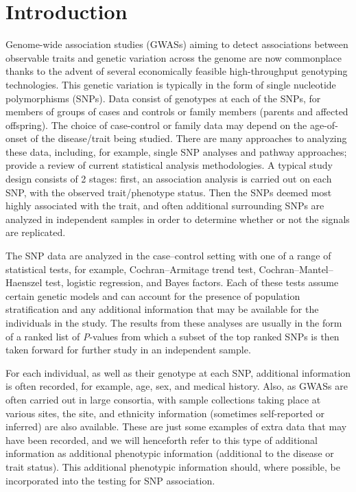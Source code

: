 \documentclass[oupdraft]{bio}
\begin{document}
\section{Introduction}
\label{sec1}

Genome-wide association studies (GWASs) aiming to detect
associations between observable traits and genetic variation
across the genome are now commonplace thanks to the advent of
several economically feasible high-throughput genotyping
technologies. This genetic variation is typically in the form of
single nucleotide polymorphisms (SNPs). Data consist of genotypes
at each of the SNPs, for members of groups of cases and controls
or family members (parents and affected offspring). The choice
of case-control or family data may depend on the age-of-onset
of the disease/trait being studied. There are many approaches to
analyzing these data, including, for example, single SNP
analyses and pathway approaches;
\citet{allison2006}
provide a review of current statistical analysis methodologies.
A typical study design consists of 2 stages: first, an association
analysis is carried out on each SNP, with the observed trait/phenotype
status. Then the SNPs deemed most highly associated with the trait,
and often additional surrounding SNPs are analyzed in independent
samples in order to determine whether or not the signals are
replicated.

The SNP data are analyzed in the case--control setting with one of a
range of statistical tests, for example, Cochran--Armitage trend
test, Cochran--Mantel--Haenszel test, logistic regression, and
Bayes factors. Each of these tests assume certain genetic models
and can account for the presence of population stratification and
any additional information that may be available for the individuals
in the study. The results from these analyses are usually in the
form of a ranked list of \textit{P}-values from which a subset of
the top ranked SNPs is then taken forward for further study in an
independent sample.

For each individual, as well as their genotype at each SNP,
additional information is often recorded, for example, age, sex,
and medical history. Also, as GWASs are often carried out
in large consortia, with sample collections taking place at
various sites, the site, and ethnicity information (sometimes
self-reported or inferred) are also available. These are just some
examples of extra data that may have been recorded, and we will
henceforth refer to this type of additional information as
additional phenotypic information (additional to the disease or
trait status). This additional phenotypic information should,
where possible, be incorporated into the testing for SNP
association.
\end{document}
